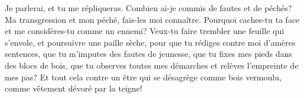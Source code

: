 Je parlerai, et tu me répliqueras.
Combien ai-je commis de fautes et de péchés?
	Ma transgression et mon péché, fais-les moi connaître.
Pourquoi caches-tu ta face et me considères-tu comme un ennemi?
Veux-tu faire trembler une feuille qui s’envole, et poursuivre une paille sèche,
	pour que tu rédiges contre moi d’amères sentences,
	que tu m’imputes des fautes de jeunesse,
	que tu fixes mes pieds dans des blocs de bois,
	que tu observes toutes mes démarches et relèves l’empreinte de mes pas?
Et tout cela contre un être qui se désagrège comme bois vermoulu,
	comme vêtement dévoré par la teigne!
